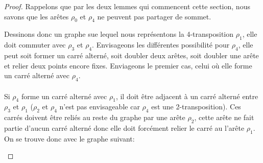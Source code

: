 \begin{proof}
  Rappelons que par les deux lemmes qui commencent cette section, nous savons que les arêtes $\rho_0$ et $\rho_4$ ne peuvent pas partager de sommet.


  Dessinons donc un graphe sue lequel nous représentons la 4-transposition $\rho_1$, elle doit commuter avec $\rho_3$ et $\rho_4$. Envisageons les différentes possibilité pour $\rho_4$, elle peut soit former un carré alterné, soit doubler deux arêtes, soit doubler une arête et relier deux points encore fixes. Enviageons le premier cas, celui où elle forme un carré alterné avec $\rho_4$.

  \paragraph{}
  Si $\rho_4$ forme un carré alterné avec $\rho_1$, il doit être adjacent à un carré alterné entre $\rho_3$ et $\rho_1$ ($\rho_2$ et $\rho_4$ n'est pas envisageable car $\rho_4$ est une 2-transposition). Ces carrés doivent être reliés au reste du graphe par une arête $\rho_2$, cette arête ne fait partie d'aucun carré alterné donc elle doit forcément relier le carré au l'arête $\rho_1$. On se trouve donc avec le graphe suivant:

  \begin{figure}[H]
    \begin{center}
\end{center}
\end{figure}
\end{proof}
